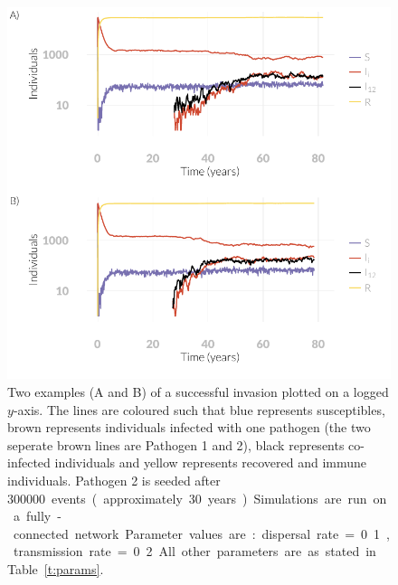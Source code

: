 \begin{knitrout}\footnotesize
{}\color{fgcolor}\begin{figure}[t]

{\centering \includegraphics[width=\textwidth]{figure/A-plotsInvade-1} 

}

\caption[
Examples of simulated SIR dynamics with successfull invasions
]{
Two examples (A and B) of a successful invasion plotted on a logged $y$-axis.
The lines are coloured such that blue represents susceptibles, brown represents individuals infected with one pathogen (the two seperate brown lines are Pathogen 1 and 2), black represents co-infected individuals and yellow represents recovered and immune individuals.
Pathogen 2 is seeded after \SI{300000} events (approximately 30 years).
Simulations are run on a fully-connected network.
Parameter values are: dispersal rate = 0.1, transmission rate = 0.2.
All other parameters are as stated in Table~\ref{t:params}.
}\label{fig:plotsInvade}
\end{figure}


\end{knitrout}










